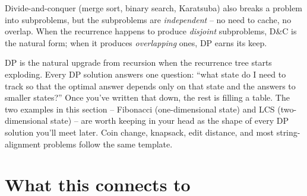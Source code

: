 \documentclass[11pt]{article}
\begin{document}
\begin{notebox}
Divide-and-conquer (merge sort, binary search, Karatsuba) also
breaks a problem into subproblems, but the subproblems are
\emph{independent} -- no need to cache, no overlap. When the
recurrence happens to produce \emph{disjoint} subproblems, D\&C is
the natural form; when it produces \emph{overlapping} ones, DP
earns its keep.
\end{notebox}

\begin{ideabox}
DP is the natural upgrade from recursion when the recurrence tree
starts exploding. Every DP solution answers one question: ``what
state do I need to track so that the optimal answer depends only on
that state and the answers to smaller states?'' Once you've written
that down, the rest is filling a table. The two examples in this
section -- Fibonacci (one-dimensional state) and LCS
(two-dimensional state) -- are worth keeping in your head as the
shape of every DP solution you'll meet later. Coin change,
knapsack, edit distance, and most string-alignment problems follow
the same template.
\end{ideabox}

\section*{What this connects to}
\end{document}
